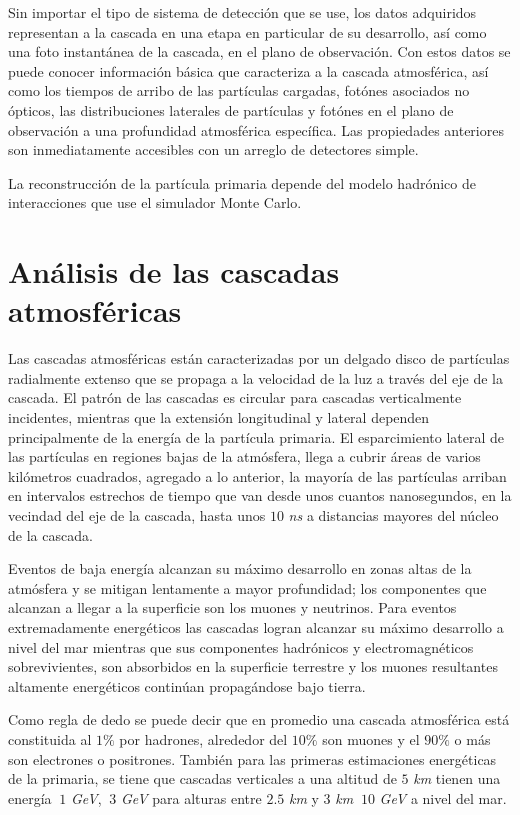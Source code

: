 Sin importar el tipo de sistema de detección que se use, los datos adquiridos representan a la cascada en una etapa en particular de su desarrollo, así como una foto instantánea de la cascada, en el plano de observación. Con estos datos se puede conocer información básica que caracteriza a la cascada atmosférica, así como los tiempos de arribo de las partículas cargadas, fotónes asociados no ópticos, las distribuciones laterales de partículas y fotónes en el plano de observación a una profundidad atmosférica específica. Las propiedades anteriores son inmediatamente accesibles con un arreglo de detectores simple.

La reconstrucción de la partícula primaria depende del modelo hadrónico de interacciones que use el simulador Monte Carlo.

\section{Análisis de las cascadas atmosféricas}

Las cascadas atmosféricas están caracterizadas por un delgado disco de partículas radialmente extenso que se propaga a la velocidad de la luz a través del eje de la cascada. El patrón de las cascadas es circular para cascadas verticalmente incidentes, mientras que la extensión longitudinal y lateral dependen principalmente de la energía de la partícula primaria. El esparcimiento lateral de las partículas en regiones bajas de la atmósfera, llega a cubrir áreas de varios kilómetros cuadrados, agregado a lo anterior, la mayoría de las partículas arriban en intervalos estrechos de tiempo que van desde unos cuantos nanosegundos, en la vecindad del eje de la cascada, hasta unos $10$ \textit{ns} a distancias mayores del núcleo de la cascada.

Eventos de baja energía alcanzan su máximo desarrollo en zonas altas de la atmósfera y se mitigan lentamente a mayor profundidad; los componentes que alcanzan a llegar a la superficie son los muones y neutrinos. Para eventos extremadamente energéticos las cascadas logran alcanzar su máximo desarrollo a nivel del mar mientras que sus componentes hadrónicos y electromagnéticos sobrevivientes, son absorbidos en la superficie terrestre y los muones resultantes altamente energéticos continúan propagándose bajo tierra. 

Como regla de dedo se puede decir que en promedio una cascada atmosférica está constituida al $1\%$ por hadrones, alrededor del $10\%$ son muones y el $90\%$ o más son electrones o positrones. También para las primeras estimaciones energéticas de la primaria, se tiene que cascadas verticales a una altitud de $5$ \textit{km} tienen una energía $~1$ \textit{GeV}, $~3$ \textit{GeV} para alturas entre $2.5$ \textit{km} y $3$ \textit{km} $~10$ \textit{GeV} a nivel del mar.

